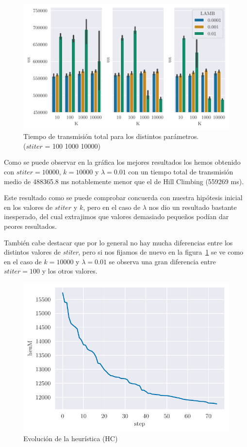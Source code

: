 \begin{figure}[H]
    \centering
    \includegraphics{include/plots/ex3_histSA.pdf}
    \caption{Tiempo de transmisión total para los distintos parámetros.\\ ($stiter$ = 100 1000 10000)}
    \label{fig:ex3_histSA}
\end{figure}

Como se puede observar en la gráfica los mejores resultados los hemos obtenido con $stiter=10000$, $k=10000$ y $\lambda=0.01$ con un tiempo total de transmisión medio de 488365.8 ms notablemente menor que el de Hill Climbing (559269 ms). 

Este resultado como se puede comprobar concuerda con nuestra hipótesis inicial en los valores de $stiter$ y $k$, pero en el caso de $\lambda$ nos dio un resultado bastante inesperado, del cual extrajimos que valores demasiado pequeños podían dar peores resultados.

También cabe destacar que por lo general no hay mucha diferencias entre los distintos valores de \emph{stiter}, pero si nos fijamos de nuevo en la figura~\ref{fig:ex3_histSA} se ve como en el caso de $k=10000$ y $\lambda=0.01$ se observa una gran diferencia entre $stiter=100$ y los otros valores.

\begin{figure}[H]
    \centering
    \includegraphics{include/plots/ex3_heu_steps-HC.pdf}
    \caption{Evolución de la heurística (HC)}
    \label{fig:ex3_heu_steps-HC} 
\end{figure}

